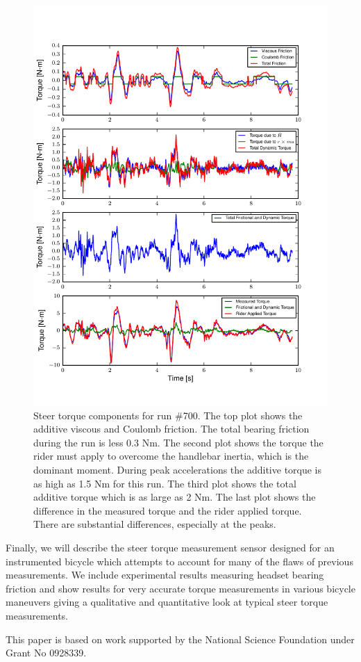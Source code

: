 \documentclass[a4paper]{article}
\begin{document}
\begin{figure}
  \centering
  \includegraphics[width=5.0in]{steer-torque-components.pdf}
  \caption{Steer torque components for run \#700. The top plot shows the
  additive viscous and Coulomb friction. The total bearing friction during the
  run is less 0.3 Nm. The second plot shows the torque the rider must apply to
  overcome the handlebar inertia, which is the dominant moment. During peak
  accelerations the additive torque is as high as 1.5 Nm for this run. The
  third plot shows the total additive torque which is as large as 2 Nm. The
  last plot shows the difference in the measured torque and the rider applied
  torque. There are substantial differences, especially at the peaks.}
\end{figure}

Finally, we will describe the steer torque measurement sensor designed for an
instrumented bicycle which attempts to account for many of the flaws of
previous measurements. We include experimental results measuring headset
bearing friction and show results for very accurate torque measurements in
various bicycle maneuvers giving a qualitative and quantitative look at typical
steer torque measurements.

This paper is based on work supported by the National Science Foundation under
Grant No 0928339.



\end{document}
